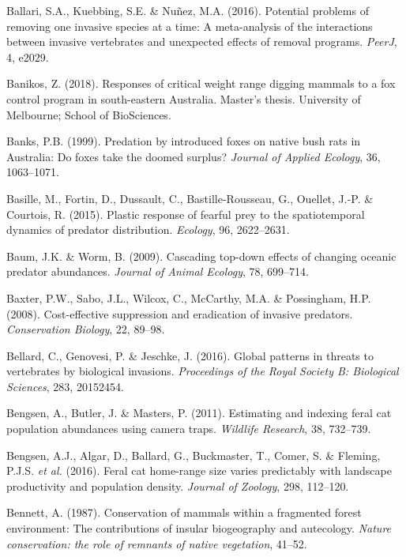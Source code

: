\documentclass[11pt,a4paper,titlepage,twoside,openright]{style/unimelbthesis}
\begin{document}
\begin{mainmatter}
\leavevmode\hypertarget{ref-ballari2016potential}{}%
Ballari, S.A., Kuebbing, S.E. \& Nuñez, M.A. (2016). Potential problems of removing one invasive species at a time: A meta-analysis of the interactions between invasive vertebrates and unexpected effects of removal programs. \emph{PeerJ}, 4, e2029.

\leavevmode\hypertarget{ref-banikos2018responses}{}%
Banikos, Z. (2018). Responses of critical weight range digging mammals to a fox control program in south-eastern Australia. Master's thesis. University of Melbourne; School of BioSciences.

\leavevmode\hypertarget{ref-banks1999predation}{}%
Banks, P.B. (1999). Predation by introduced foxes on native bush rats in Australia: Do foxes take the doomed surplus? \emph{Journal of Applied Ecology}, 36, 1063--1071.

\leavevmode\hypertarget{ref-basille2015plastic}{}%
Basille, M., Fortin, D., Dussault, C., Bastille-Rousseau, G., Ouellet, J.-P. \& Courtois, R. (2015). Plastic response of fearful prey to the spatiotemporal dynamics of predator distribution. \emph{Ecology}, 96, 2622--2631.

\leavevmode\hypertarget{ref-baum2009cascading}{}%
Baum, J.K. \& Worm, B. (2009). Cascading top-down effects of changing oceanic predator abundances. \emph{Journal of Animal Ecology}, 78, 699--714.

\leavevmode\hypertarget{ref-baxter2008cost}{}%
Baxter, P.W., Sabo, J.L., Wilcox, C., McCarthy, M.A. \& Possingham, H.P. (2008). Cost-effective suppression and eradication of invasive predators. \emph{Conservation Biology}, 22, 89--98.

\leavevmode\hypertarget{ref-bellard2016global}{}%
Bellard, C., Genovesi, P. \& Jeschke, J. (2016). Global patterns in threats to vertebrates by biological invasions. \emph{Proceedings of the Royal Society B: Biological Sciences}, 283, 20152454.

\leavevmode\hypertarget{ref-bengsen2011estimating}{}%
Bengsen, A., Butler, J. \& Masters, P. (2011). Estimating and indexing feral cat population abundances using camera traps. \emph{Wildlife Research}, 38, 732--739.

\leavevmode\hypertarget{ref-bengsen2016feral}{}%
Bengsen, A.J., Algar, D., Ballard, G., Buckmaster, T., Comer, S. \& Fleming, P.J.S. \emph{et al.} (2016). Feral cat home-range size varies predictably with landscape productivity and population density. \emph{Journal of Zoology}, 298, 112--120.

\leavevmode\hypertarget{ref-bennett1987conservation}{}%
Bennett, A. (1987). Conservation of mammals within a fragmented forest environment: The contributions of insular biogeography and autecology. \emph{Nature conservation: the role of remnants of native vegetation}, 41--52.


\end{mainmatter}
\end{document}
